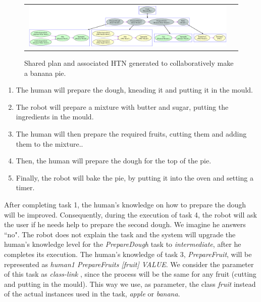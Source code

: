 \begin{figure}[ht!]
 \centering
 \begin{tabular}{cc}
  \includegraphics[width=0.99\textwidth]{img/teacher/bananaPie.pdf}
 \end{tabular}
   \vspace{-8pt}
 \caption{Shared plan and associated HTN generated to collaboratively make a banana pie.}
 \label{fig:teacher_results-bananaPlan}
   \vspace{-22pt}
 \end{figure}
 

\begin{enumerate}
\item The human will prepare the dough, kneading it and putting it in the mould.
\item The robot will prepare a mixture with butter and sugar, putting the ingredients in the mould.
\item The human will then prepare the required fruits, cutting them and adding them to the mixture..
\item Then, the human will prepare the dough for the top of the pie.
\item Finally, the robot will bake the pie, by putting it into the oven and setting a timer.
\end{enumerate} 

After completing task 1, the human's knowledge on how to prepare the dough will be improved. Consequently, during the execution of task 4, the robot will ask the user if he needs help to prepare the second dough. We imagine he answers ``no". The robot does not explain the task  and the system will upgrade the human's knowledge level for the \textit{PrepareDough} task to  \textit{intermediate}, after he completes its execution. The human's knowledge of task 3, \textit{PrepareFruit}, will be represented as \textit{human1 PrepareFruits [fruit] VALUE}. We consider the parameter of this task as \textit{class-link} , since the process will be the same for any fruit (cutting and putting in the mould). This way we use, as parameter, the class \textit{fruit} instead of the actual instances used in the task, \textit{apple} or \textit{banana}.

